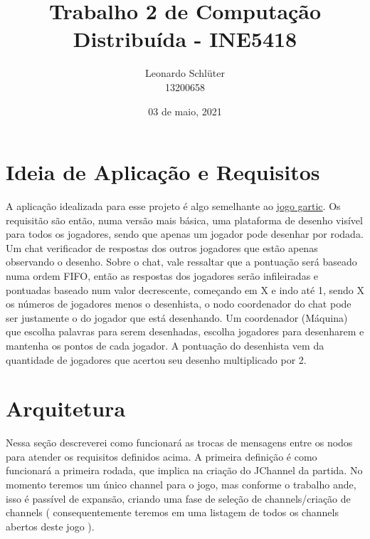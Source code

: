\documentclass{article}
\title{Trabalho 2 de Computação Distribuída - INE5418}
\author{Leonardo Schlüter \\ 13200658}
\date{03 de maio, 2021}
\begin{document}
\maketitle

\section{Ideia de Aplicação e Requisitos}

A aplicação idealizada para esse projeto é algo semelhante ao \href{https://gartic.com.br/}{jogo gartic}. Os requisitão são então, numa versão mais básica, uma plataforma de desenho visível para todos os jogadores, sendo que apenas um jogador pode desenhar por rodada. Um chat verificador de respostas dos outros jogadores que estão apenas observando o desenho. Sobre o chat, vale ressaltar que a pontuação será baseado numa ordem FIFO, então as respostas dos jogadores serão infileiradas e pontuadas baseado num valor decrescente, começando em X e indo até 1, sendo X os números de jogadores menos o desenhista, o nodo coordenador do chat pode ser justamente o do jogador que está desenhando. Um coordenador (Máquina) que escolha palavras para serem desenhadas, escolha jogadores para desenharem e mantenha os pontos de cada jogador. A pontuação do desenhista vem da quantidade de jogadores que acertou seu desenho multiplicado por 2. 

\section{Arquitetura}


Nessa seção descreverei como funcionará as trocas de mensagens entre os nodos para atender os requisitos definidos acima. A primeira definição é como funcionará a primeira rodada, que implica na criação do JChannel da partida. No momento teremos um único channel para o jogo, mas conforme o trabalho ande, isso é passível de expansão, criando uma fase de seleção de channels/criação de channels ( consequentemente teremos em uma listagem de todos os channels abertos deste jogo ).
\end{document}
